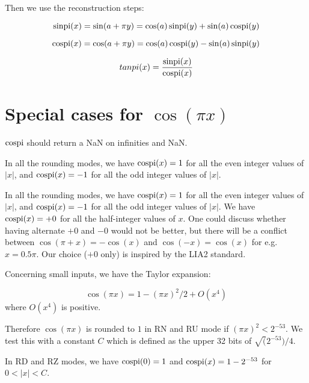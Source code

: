 Then we use the reconstruction steps:

\begin{equation}        
  \operatorname{sinpi}(x) = \sin(a + \pi y) =  \cos(a) \operatorname{sinpi}(y) +  \sin(a) \operatorname{cospi}(y) 
  \label{eq:sinpiapy}
\end{equation}

\begin{equation}
  \operatorname{cospi}(x) = \cos(a + \pi y) = \cos(a) \operatorname{cospi}(y) -  \sin(a) \operatorname{sinpi}(y) 
  \label{eq:cospiapy}
\end{equation}

\begin{equation} 
  tanpi(x) = \frac{\operatorname{sinpi}(x)}{\operatorname{cospi}(x)} 
  \label{eq:tanpiapy}
\end{equation}



\section{Special cases for $\cos(\pi x)$ }

$\operatorname{cospi}$ should return a NaN on infinities and NaN.

In all the rounding modes, we have $\operatorname{cospi}(x)=1$ for all the even integer
 values of $|x|$, and $\operatorname{cospi}(x)=-1$ for all the odd integer values of
 $|x|$.


 In all the rounding modes, we have $\operatorname{cospi}(x)=1$ for all the even
 integer values of $|x|$, and $\operatorname{cospi}(x)=-1$ for all the odd integer
 values of $|x|$. We have $\operatorname{cospi}(x)=+0$ for all the half-integer
 values of $x$. One could discuss whether having alternate $+0$ and
 $-0$ would not be better, but there will be a conflict between
 $\cos(\pi+x)=-\cos(x)$ and $\cos(-x)=\cos(x)$ for e.g. $x=0.5\pi$.
 Our choice ($+0$ only) is inspired by the LIA2 standard.


 Concerning small inputs, we have the Taylor expansion:

  \begin{equation}
    \cos(\pi x) = 1-(\pi x)^2/2 + O(x^4)\label{eq:cospiTaylor}
  \end{equation}
 where $O(x^4)$ is positive.

 Therefore $\cos(\pi x)$ is rounded to $1$ in RN and RU mode if $(\pi
 x)^2<{2^{-53}}$. We test this with a constant $C$ which is defined as
 the upper 32 bits of $\sqrt(2^{-53})/4$.

 In RD and RZ modes, we have $\operatorname{cospi}(0)=1$ and $\operatorname{cospi}(x)=1-2^{-53}$
 for $0<|x|<C$. 





